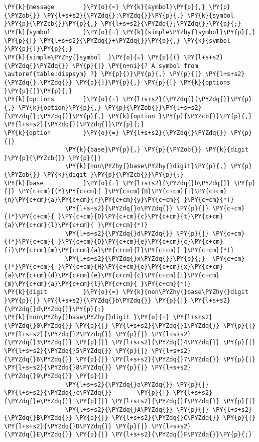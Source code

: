 \begin{Verbatim}[commandchars=\\\{\},codes={\catcode`\$=3\catcode`\^=7\catcode`\_=8}]
\PY{k}{message        }\PY{o}{=} \PY{k}{symbol}\PY{p}{,} \PY{p}{\PYZob{}} \PY{l+s+s2}{\PYZdq{}:\PYZdq{}}\PY{p}{,} \PY{k}{symbol }\PY{p}{\PYZcb{}}\PY{p}{,} \PY{l+s+s2}{\PYZdq{};\PYZdq{}}\PY{p}{;}
\PY{k}{symbol         }\PY{o}{=} \PY{k}{simple\PYZhy{}symbol}\PY{p}{,} \PY{p}{[} \PY{l+s+s2}{\PYZdq{}+\PYZdq{}}\PY{p}{,} \PY{k}{symbol }\PY{p}{]}\PY{p}{;}
\PY{k}{simple\PYZhy{}symbol  }\PY{o}{=} \PY{p}{(} \PY{l+s+s2}{\PYZdq{}\PYZdq{}} \PY{p}{|} \PY{n+ni}{? A symbol from \autoref{table:dispsym} ?} \PY{p}{)}\PY{p}{,} \PY{p}{[} \PY{l+s+s2}{\PYZdq{}.\PYZdq{}} \PY{p}{]}\PY{p}{,} \PY{p}{[} \PY{k}{options }\PY{p}{]}\PY{p}{;}
\PY{k}{options        }\PY{o}{=} \PY{l+s+s2}{\PYZdq{}(\PYZdq{}}\PY{p}{,} \PY{k}{option}\PY{p}{,} \PY{p}{\PYZob{}}\PY{l+s+s2}{\PYZdq{};\PYZdq{}}\PY{p}{,} \PY{k}{option }\PY{p}{\PYZcb{}}\PY{p}{,} \PY{l+s+s2}{\PYZdq{})\PYZdq{}}\PY{p}{;}
\PY{k}{option         }\PY{o}{=} \PY{l+s+s2}{\PYZdq{}\PYZdq{}} \PY{p}{|}
                 \PY{k}{base}\PY{p}{,} \PY{p}{\PYZob{}} \PY{k}{digit }\PY{p}{\PYZcb{}} \PY{p}{|}
                 \PY{k}{non\PYZhy{}base\PYZhy{}digit}\PY{p}{,} \PY{p}{\PYZob{}} \PY{k}{digit }\PY{p}{\PYZcb{}}\PY{p}{;}
\PY{k}{base           }\PY{o}{=} \PY{l+s+s2}{\PYZdq{}b\PYZdq{}} \PY{p}{|} \PY{c+cm}{(*}\PY{c+cm}{ }\PY{c+cm}{B}\PY{c+cm}{i}\PY{c+cm}{n}\PY{c+cm}{a}\PY{c+cm}{r}\PY{c+cm}{y}\PY{c+cm}{ }\PY{c+cm}{*)}
                 \PY{l+s+s2}{\PYZdq{}o\PYZdq{}} \PY{p}{|} \PY{c+cm}{(*}\PY{c+cm}{ }\PY{c+cm}{O}\PY{c+cm}{c}\PY{c+cm}{t}\PY{c+cm}{a}\PY{c+cm}{l}\PY{c+cm}{ }\PY{c+cm}{*)}
                 \PY{l+s+s2}{\PYZdq{}d\PYZdq{}} \PY{p}{|} \PY{c+cm}{(*}\PY{c+cm}{ }\PY{c+cm}{D}\PY{c+cm}{e}\PY{c+cm}{c}\PY{c+cm}{i}\PY{c+cm}{m}\PY{c+cm}{a}\PY{c+cm}{l}\PY{c+cm}{ }\PY{c+cm}{*)}
                 \PY{l+s+s2}{\PYZdq{}x\PYZdq{}}\PY{p}{;}  \PY{c+cm}{(*}\PY{c+cm}{ }\PY{c+cm}{H}\PY{c+cm}{e}\PY{c+cm}{x}\PY{c+cm}{a}\PY{c+cm}{d}\PY{c+cm}{e}\PY{c+cm}{c}\PY{c+cm}{i}\PY{c+cm}{m}\PY{c+cm}{a}\PY{c+cm}{l}\PY{c+cm}{ }\PY{c+cm}{*)}
\PY{k}{digit          }\PY{o}{=} \PY{k}{non\PYZhy{}base\PYZhy{}digit }\PY{p}{|} \PY{l+s+s2}{\PYZdq{}b\PYZdq{}} \PY{p}{|} \PY{l+s+s2}{\PYZdq{}d\PYZdq{}}\PY{p}{;}
\PY{k}{non\PYZhy{}base\PYZhy{}digit }\PY{o}{=} \PY{l+s+s2}{\PYZdq{}0\PYZdq{}} \PY{p}{|} \PY{l+s+s2}{\PYZdq{}1\PYZdq{}} \PY{p}{|} \PY{l+s+s2}{\PYZdq{}2\PYZdq{}} \PY{p}{|} \PY{l+s+s2}{\PYZdq{}3\PYZdq{}} \PY{p}{|} \PY{l+s+s2}{\PYZdq{}4\PYZdq{}} \PY{p}{|} \PY{l+s+s2}{\PYZdq{}5\PYZdq{}} \PY{p}{|} \PY{l+s+s2}{\PYZdq{}6\PYZdq{}} \PY{p}{|} \PY{l+s+s2}{\PYZdq{}7\PYZdq{}} \PY{p}{|} \PY{l+s+s2}{\PYZdq{}8\PYZdq{}} \PY{p}{|} \PY{l+s+s2}{\PYZdq{}9\PYZdq{}} \PY{p}{|}
                 \PY{l+s+s2}{\PYZdq{}a\PYZdq{}} \PY{p}{|}       \PY{l+s+s2}{\PYZdq{}c\PYZdq{}}       \PY{p}{|} \PY{l+s+s2}{\PYZdq{}e\PYZdq{}} \PY{p}{|} \PY{l+s+s2}{\PYZdq{}f\PYZdq{}} \PY{p}{|}
                 \PY{l+s+s2}{\PYZdq{}A\PYZdq{}} \PY{p}{|} \PY{l+s+s2}{\PYZdq{}B\PYZdq{}} \PY{p}{|} \PY{l+s+s2}{\PYZdq{}C\PYZdq{}} \PY{p}{|} \PY{l+s+s2}{\PYZdq{}D\PYZdq{}} \PY{p}{|} \PY{l+s+s2}{\PYZdq{}E\PYZdq{}} \PY{p}{|} \PY{l+s+s2}{\PYZdq{}F\PYZdq{}}\PY{p}{;}
\end{Verbatim}

